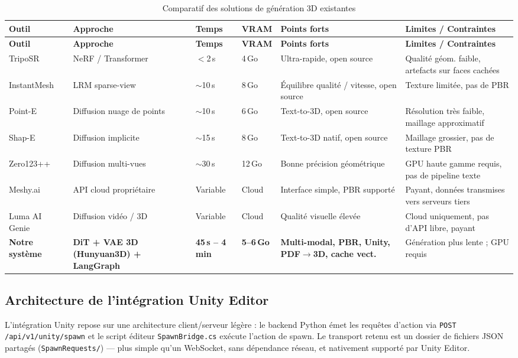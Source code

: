 \documentclass[12pt,a4paper,oneside]{report}
\renewcommand{\arraystretch}{1.35}
\newcommand{\theadrow}{\rowcolor{tekupblue!12}}
\begin{document}
{\footnotesize\renewcommand{\arraystretch}{1.2}
\begin{longtable}{@{}p{2.3cm}p{2.2cm}p{1.3cm}p{1.1cm}p{2.6cm}p{3.8cm}@{}}
\caption{Comparatif des solutions de génération 3D existantes}
\label{tab:existant}\\
\toprule
\theadrow
\textbf{Outil} & \textbf{Approche} & \textbf{Temps} & \textbf{VRAM} &
\textbf{Points forts} & \textbf{Limites / Contraintes} \\
\midrule
\endfirsthead
\toprule
\theadrow
\textbf{Outil} & \textbf{Approche} & \textbf{Temps} & \textbf{VRAM} &
\textbf{Points forts} & \textbf{Limites / Contraintes} \\
\midrule
\endhead
\bottomrule
\endlastfoot

TripoSR~\cite{triposr}
  & NeRF / Transformer & $<$2\,s & 4\,Go
  & Ultra-rapide, open source
  & Qualité géom. faible, artefacts sur faces cachées \\[2pt]
InstantMesh~\cite{instantmesh}
  & LRM sparse-view & $\sim$10\,s & 8\,Go
  & Équilibre qualité / vitesse, open source
  & Texture limitée, pas de PBR \\[2pt]
Point-E~\cite{pointe}
  & Diffusion nuage de points & $\sim$10\,s & 6\,Go
  & Text-to-3D, open source
  & Résolution très faible, maillage approximatif \\[2pt]
Shap-E~\cite{shape_e}
  & Diffusion implicite & $\sim$15\,s & 8\,Go
  & Text-to-3D natif, open source
  & Maillage grossier, pas de texture PBR \\[2pt]
Zero123++~\cite{zero123pp}
  & Diffusion multi-vues & $\sim$30\,s & 12\,Go
  & Bonne précision géométrique
  & GPU haute gamme requis, pas de pipeline texte \\[2pt]
Meshy.ai
  & API cloud propriétaire & Variable & Cloud
  & Interface simple, PBR supporté
  & Payant, données transmises vers serveurs tiers \\[2pt]
Luma AI Genie
  & Diffusion vidéo / 3D & Variable & Cloud
  & Qualité visuelle élevée
  & Cloud uniquement, pas d'API libre, payant \\[4pt]
\midrule
\textbf{Notre système}~\cite{hunyuan3d2024}
  & \textbf{DiT + VAE 3D (Hunyuan3D) + LangGraph}
  & \textbf{45\,s -- 4\,min} & \textbf{5--6\,Go}
  & \textbf{Multi-modal, PBR, Unity, PDF$\rightarrow$3D, cache vect.}
  & Génération plus lente ; GPU requis \\
\end{longtable}
}

\subsection{Architecture de l'intégration Unity Editor}
L'intégration Unity repose sur une architecture client/serveur légère :
le backend Python émet les requêtes d'action via \texttt{POST /api/v1/unity/spawn}
et le script éditeur \texttt{SpawnBridge.cs} exécute l'action de spawn.
Le transport retenu est un dossier de fichiers JSON partagés (\texttt{SpawnRequests/})
--- plus simple qu'un WebSocket, sans dépendance réseau, et nativement
supporté par Unity Editor.
\end{document}
